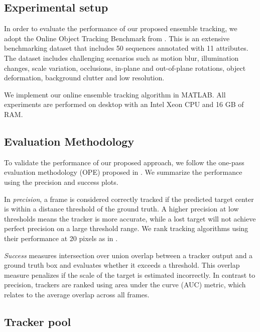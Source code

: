 \subsection{Experimental setup}
In order to evaluate the performance of our proposed ensemble tracking,
we adopt the Online Object Tracking Benchmark from \cite{Wu2013}.
This is an extensive benchmarking dataset that includes 50 sequences
annotated with 11 attributes.
The dataset includes challenging scenarios such as motion blur,
illumination changes, scale variation, occlusions,
in-plane and out-of-plane rotations, object deformation,
background clutter and low resolution.

We implement our online ensemble tracking algorithm in MATLAB.
All experiments are performed on desktop with an Intel Xeon CPU
and 16 GB of RAM.


\subsection{Evaluation Methodology}
To validate the performance of our proposed approach, we follow the one-pass
evaluation methodology (OPE) proposed in \cite{Wu2013}. 
We summarize the performance using the precision and success plots.

In
\textit{precision}, a frame is considered correctly tracked if the predicted
target center is within a distance threshold of the ground truth.
A higher precision at low thresholds means the tracker is
more accurate, while a lost target will not achieve perfect precision on a large
threshold range.
We rank tracking algorithms using their performance at 20 pixels
as in \cite{Babenko2010, Wu2013, Henriques2014}.

\textit{Success} measures intersection over union overlap between a tracker
output and a ground truth box and evaluates whether it exceeds a threshold.
This overlap measure penalizes if the scale of the target is estimated incorrectly.
In contrast to precision, trackers are ranked using area under
the curve (AUC) metric, which relates to the average overlap across all frames. 

\subsection{Tracker pool}

